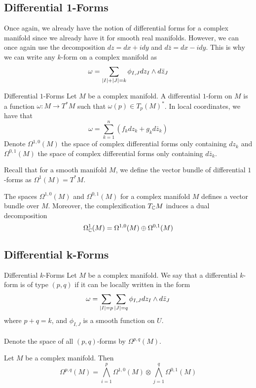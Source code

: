 \documentclass[a4paper]{article}
\begin{document}
\subsection{Differential 1-Forms}
Once again, we already have the notion of differential forms for a complex manifold since we already have it for smooth real manifolds. However, we can once again use the decomposition $dz=dx+idy$ and $d\bar{z}=dx-idy$. This is why we can write any $k$-form on a complex manifold as $$\omega=\sum_{\abs{I}+\abs{J}=k}\phi_{I,J}dz_I\wedge d\bar{z}_J$$

\begin{defn}{Differential $1$-Forms}{} Let $M$ be a complex manifold. A differential $1$-form on $M$ is a function $\omega:M\to T^\ast M$ such that $\omega(p)\in T_p(M)^\ast$. In local coordinates, we have that $$\omega=\sum_{k=1}^n(f_kdz_k+g_kd\bar{z}_k)$$
Denote $\Omega^{1,0}(M)$ the space of complex differential forms only containing $dz_k$ and $\Omega^{0,1}(M)$ the space of complex differential forms only containing $d\bar{z}_k$. 
\end{defn}

Recall that for a smooth manifold $M$, we define the vector bundle of differential $1$-forms as $\Omega^1(M)=T^\ast M$. 

\begin{prp}{}{} The spaces $\Omega^{1,0}(M)$ and $\Omega^{0,1}(M)$ for a complex manifold $M$ defines a vector bundle over $M$. Moreover, the complexification $T_{\mathbb{C}}M$ induces a dual decomposition $$\Omega_{\mathbb{C}}^1(M)=\Omega^{1,0}(M)\oplus\Omega^{0,1}(M)$$
\end{prp}

\subsection{Differential k-Forms}
\begin{defn}{Differential $k$-Forms}{} Let $M$ be a complex manifold. We say that a differential $k$-form is of type $(p,q)$ if it can be locally written in the form $$\omega=\sum_{\abs{I}=p}\sum_{\abs{J}=q}\phi_{I,J}dz_I\wedge d\bar{z}_J$$ where $p+q=k$, and $\phi_{I,J}$ is a smooth function on $U$. \\~\\
Denote the space of all $(p,q)$-forms by $\Omega^{p,q}(M)$. 
\end{defn}

\begin{prp}{}{} Let $M$ be a complex manifold. Then $$\Omega^{p,q}(M)=\bigwedge_{i=1}^p\Omega^{1,0}(M)\otimes\bigwedge_{j=1}^q\Omega^{0,1}(M)$$
\end{prp}
\end{document}
